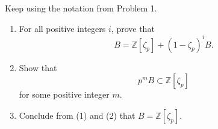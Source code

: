 \documentclass[12pt]{article}  %
\begin{document}
\begin{problem}{2}
Keep using the notation from Problem 1.

\begin{enumerate}
    \item For all positive integers $i$, prove that
          \[
              B = \mathbb{Z}[\zeta_p] + (1-\zeta_p)^i B.
          \]

    \item Show that
          \[
              p^m B \subset \mathbb{Z}[\zeta_p]
          \]
          for some positive integer $m$.

    \item Conclude from (1) and (2) that $B = \mathbb{Z}[\zeta_p]$.
\end{enumerate}
\end{problem}
\end{document}

